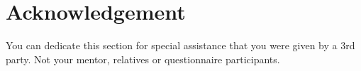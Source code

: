 \section*{Acknowledgement}

You can dedicate this section for special assistance that you were given by a 3rd party. Not your mentor, relatives or questionnaire participants.